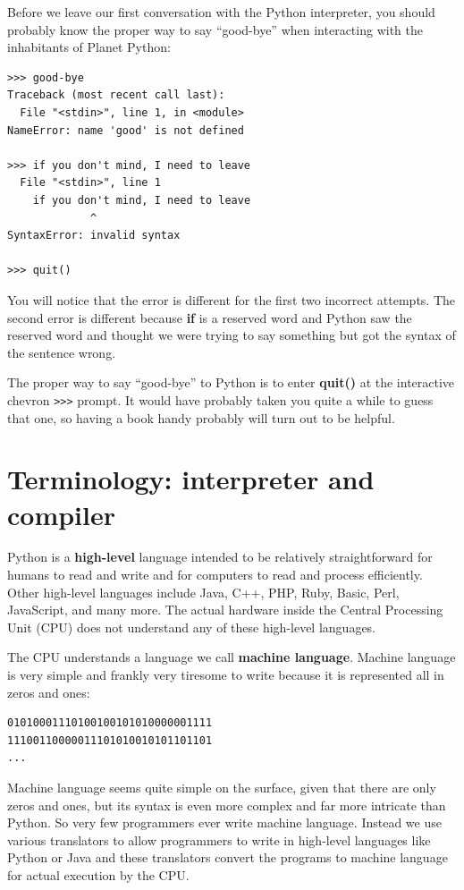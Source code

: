 Before we leave our first conversation with the Python 
interpreter, you should probably know the proper way
to say ``good-bye'' when interacting with the inhabitants
of Planet Python:

\beforeverb
\begin{verbatim}
>>> good-bye
Traceback (most recent call last):
  File "<stdin>", line 1, in <module>
NameError: name 'good' is not defined

>>> if you don't mind, I need to leave
  File "<stdin>", line 1
    if you don't mind, I need to leave
             ^
SyntaxError: invalid syntax

>>> quit()
\end{verbatim}
\afterverb
%
You will notice that the error is different for the first two
incorrect attempts.   The second error is different because 
{\bf if} is a reserved word and Python saw the reserved word
and thought we were trying to say something but got the syntax
of the sentence wrong.

The proper way to say ``good-bye'' to Python is to enter 
{\bf quit()} at the interactive chevron {\tt >>>} prompt.
It would have probably taken you quite a while to guess that 
one, so having a book handy probably will turn out 
to be helpful.

\section{Terminology: interpreter and compiler}

Python is a {\bf high-level} language intended to be relatively
straightforward for humans to read and write and for computers
to read and process efficiently.  Other high-level languages include Java, C++,
PHP, Ruby, Basic, Perl, JavaScript, and many more.  The actual hardware
inside the Central Processing Unit (CPU) does not understand any
of these high-level languages.

The CPU understands a language we call {\bf machine language}.  Machine
language is very simple and frankly very tiresome to write because it 
is represented all in zeros and ones:

\beforeverb
\begin{verbatim}
01010001110100100101010000001111
11100110000011101010010101101101
...
\end{verbatim}
\afterverb
%
Machine language seems quite simple on the surface, given that there 
are only zeros and ones, but its syntax is even more complex
and far more intricate than Python.  So very few programmers ever write
machine language.  Instead we use various translators to allow
programmers to write in high-level languages like Python or Java
and these translators convert the programs to machine language for actual
execution by the CPU.

